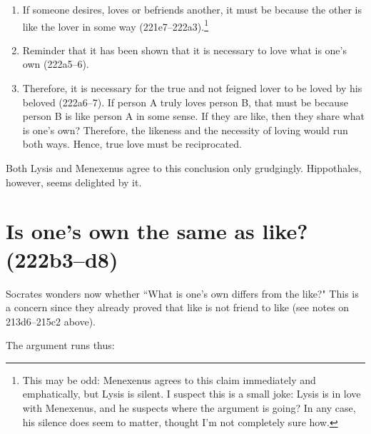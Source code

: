 \documentclass[11pt]{article}
\begin{document}
\begin{enumerate}

    \item If someone desires, loves or befriends another, it must be because
        the other is like the lover in some way (221e7--222a3).\footnote{This
        may be odd: Menexenus agrees to this claim immediately and
        emphatically, but Lysis is silent.  I suspect this is a small joke:
        Lysis is in love with Menexenus, and he suspects where the argument
        is going?  In any case, his silence does seem to matter, thought I'm
        not completely sure how.}

    \item Reminder that it has been shown that it is necessary to love what is
        one's own (222a5--6).

    \item Therefore, it is necessary for the true and not feigned lover to be
        loved by his beloved (222a6--7).  If person A truly loves person B,
        that must be because person B is like person A in some sense.  If they
        are like, then they share what is one's own?  Therefore, the likeness
        and the necessity of loving would run both ways.  Hence, true love must
        be reciprocated.

\end{enumerate}

Both Lysis and Menexenus agree to this conclusion only grudgingly.
Hippothales, however, seems delighted by it.


\section{Is one's own the same as like? (222b3--d8)}

Socrates wonders now whether ``What is one's own differs from the like?"  This
is a concern since they already proved that like is not friend to like (see
notes on 213d6--215c2 above).

The argument runs thus:
\end{document}
